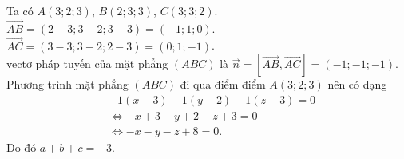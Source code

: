 \begin{bt}
{\begin{center}
		\end{center}
		Ta có $A(3;2;3)$, $B(2;3;3)$,  $C(3;3;2)$.\\
		$\overrightarrow{AB}=(2-3;3-2; 3 -  3)=(-1;1; 0)$.\\
		$\overrightarrow{AC}=(3-3; 3-2; 2 - 3)=(0;1;  -1)$.\\
		vectơ pháp tuyến của mặt phẳng $\left( ABC\right) $ là  $\overrightarrow{n}=\left[\overrightarrow{AB}, \overrightarrow{AC}\right]=(-1;-1;-1)$.\\
		Phương trình mặt phẳng $\left( ABC\right) $ đi qua điểm điểm $A(3;2;3)$ nên  có dạng
		\begin{align*}
			 &-1(x-3)-1(y-2)-1(z-3)=0\\
			&\Leftrightarrow -x+3-y+2-z+3=0\\ 
			 &\Leftrightarrow -x-y-z+8=0.
		\end{align*}
		Do đó  $a+b+c=-3$.
	} 
\end{bt}


